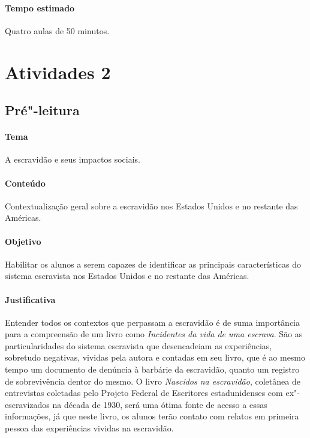 \documentclass[11pt]{extarticle}
\begin{document}
 \paragraph{Tempo estimado} Quatro aulas de 50 minutos.



\section{Atividades 2}



\subsection{Pré"-leitura}

\paragraph{Tema} A escravidão e seus impactos sociais.

\paragraph{Conteúdo} Contextualização geral sobre a escravidão nos Estados Unidos e 
no restante das Américas.

\paragraph{Objetivo} Habilitar os alunos a serem capazes de identificar
as principais características do sistema escravista nos Estados Unidos e 
no restante das Américas.

\paragraph{Justificativa} Entender todos os contextos que perpassam
a escravidão é de suma importância para a compreensão de um livro
como \emph{Incidentes da vida de uma escrava}. São as particularidades
do sistema escravista que desencadeiam as experiências, sobretudo negativas,
vividas pela autora e contadas em seu livro, que é ao mesmo tempo
um documento de denúncia à barbárie da escravidão, quanto
um registro de sobrevivência dentor do mesmo. 
O livro \emph{Nascidos na escravidão}, coletânea de entrevistas coletadas
 pelo Projeto Federal de Escritores estadunidenses com ex"-escravizados 
 na década de 1930, será uma ótima fonte de acesso a essas informações,
 já que neste livro, os alunos terão contato com relatos em primeira
 pessoa das experiências vividas na escravidão. 
\end{document}
